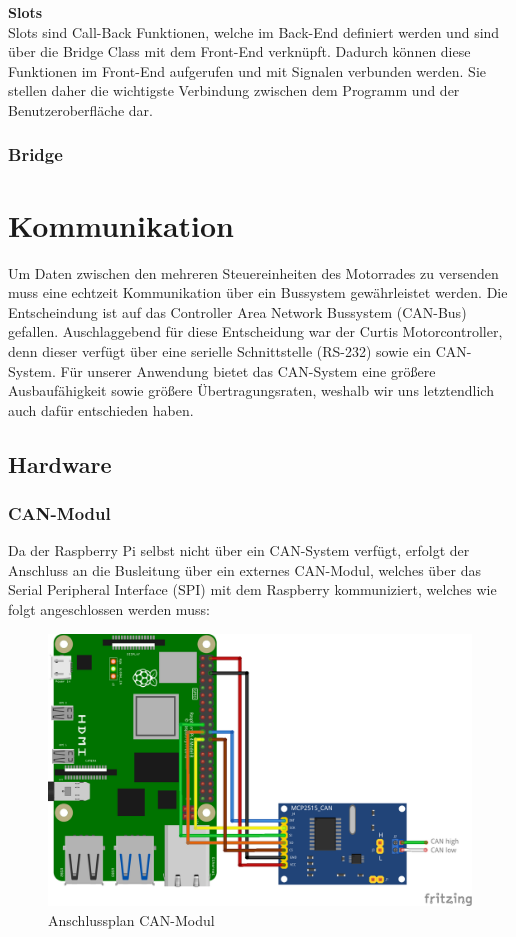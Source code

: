 \textbf{Slots}\\ \medskip
Slots sind Call-Back Funktionen, welche im Back-End definiert werden und sind über die Bridge Class mit dem Front-End verknüpft. Dadurch können diese Funktionen im Front-End aufgerufen und mit Signalen verbunden werden. Sie stellen daher die wichtigste Verbindung zwischen dem Programm und der Benutzeroberfläche dar.

\newpage
	
\subsubsection{Bridge}

\newpage


\section{Kommunikation}
Um Daten zwischen den mehreren Steuereinheiten des Motorrades zu versenden muss eine echtzeit Kommunikation über ein Bussystem gewährleistet werden. Die Entscheindung ist auf das Controller Area Network Bussystem (CAN-Bus) gefallen. Auschlaggebend für diese Entscheidung war der Curtis Motorcontroller, denn dieser verfügt über eine serielle Schnittstelle (RS-232) sowie ein CAN-System. Für unserer Anwendung bietet das CAN-System eine größere Ausbaufähigkeit sowie größere Übertragungsraten, weshalb wir uns letztendlich auch dafür entschieden haben.
\subsection{Hardware}
\subsubsection{CAN-Modul}
Da der Raspberry Pi selbst nicht über ein CAN-System verfügt, erfolgt der Anschluss an die Busleitung über ein externes CAN-Modul, welches über das Serial Peripheral Interface (SPI) mit dem Raspberry kommuniziert, welches wie folgt angeschlossen werden muss: 
\begin{figure}[H]
	\begin{center}
		\includegraphics[scale=0.9]{figures/hcis/can_module.png}
		\caption{Anschlussplan CAN-Modul}
	\end{center}
\end{figure}

